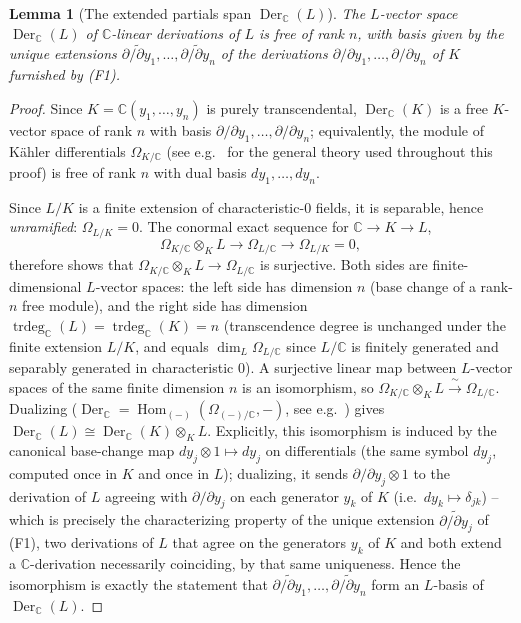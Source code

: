\documentclass[11pt,a4paper]{article}
\newtheorem{lemma}[theorem]{Lemma}
\begin{document}
\begin{lemma}[The extended partials span $\operatorname{Der}_{\mathbb{C}}(L)$]\label{lem:der-span}
The $L$-vector space $\operatorname{Der}_{\mathbb{C}}(L)$ of
$\mathbb{C}$-linear derivations of $L$ is free of rank $n$, with basis
given by the unique extensions
$\widetilde{\partial/\partial y_1},\dots,\widetilde{\partial/\partial y_n}$
of the derivations $\partial/\partial y_1,\dots,\partial/\partial y_n$
of $K$ furnished by (F1).
\end{lemma}

\begin{proof}
Since $K = \mathbb{C}(y_1,\dots,y_n)$ is purely transcendental,
$\operatorname{Der}_{\mathbb{C}}(K)$ is a free $K$-vector space of
rank $n$ with basis $\partial/\partial y_1,\dots,\partial/\partial y_n$;
equivalently, the module of K\"ahler differentials
$\Omega_{K/\mathbb{C}}$ (see e.g.\ \cite[\S 25]{Matsumura1989} for
the general theory used throughout this proof)
is free of rank $n$ with dual basis $dy_1,\dots,dy_n$.

Since $L/K$ is a finite extension of characteristic-$0$ fields, it is
separable, hence \emph{unramified}: $\Omega_{L/K} = 0$. The conormal
exact sequence for $\mathbb{C} \to K \to L$,
\[
  \Omega_{K/\mathbb{C}} \otimes_K L \longrightarrow \Omega_{L/\mathbb{C}}
    \longrightarrow \Omega_{L/K} = 0,
\]
therefore shows that $\Omega_{K/\mathbb{C}} \otimes_K L \to \Omega_{L/\mathbb{C}}$
is surjective. Both sides are finite-dimensional $L$-vector spaces:
the left side has dimension $n$ (base change of a rank-$n$ free
module), and the right side has dimension
$\operatorname{trdeg}_{\mathbb{C}}(L) = \operatorname{trdeg}_{\mathbb{C}}(K) = n$
(transcendence degree is unchanged under the finite extension $L/K$,
and equals $\dim_L \Omega_{L/\mathbb{C}}$ since $L/\mathbb{C}$ is
finitely generated and separably generated in characteristic $0$). A
surjective linear map between $L$-vector spaces of the same finite
dimension $n$ is an isomorphism, so
$\Omega_{K/\mathbb{C}} \otimes_K L \xrightarrow{\ \sim\ } \Omega_{L/\mathbb{C}}$.
Dualizing ($\operatorname{Der}_{\mathbb{C}} = \operatorname{Hom}_{(-)}(\Omega_{(-)/\mathbb{C}}, -)$,
see e.g.\ \cite[\S 25--26]{Matsumura1989})
gives
$\operatorname{Der}_{\mathbb{C}}(L) \cong \operatorname{Der}_{\mathbb{C}}(K) \otimes_K L$.
Explicitly, this isomorphism is induced by the canonical base-change
map $dy_j \otimes 1 \mapsto dy_j$ on differentials (the same symbol
$dy_j$, computed once in $K$ and once in $L$); dualizing, it sends
$\partial/\partial y_j \otimes 1$ to the derivation of $L$ agreeing
with $\partial/\partial y_j$ on each generator $y_k$ of $K$ (i.e.\
$dy_k \mapsto \delta_{jk}$) -- which is precisely the characterizing
property of the unique extension $\widetilde{\partial/\partial y_j}$
of (F1), two derivations of $L$ that agree on the generators $y_k$ of
$K$ and both extend a $\mathbb{C}$-derivation necessarily coinciding,
by that same uniqueness. Hence the isomorphism is exactly the
statement that
$\widetilde{\partial/\partial y_1},\dots,\widetilde{\partial/\partial y_n}$
form an $L$-basis of $\operatorname{Der}_{\mathbb{C}}(L)$.
\end{proof}
\end{document}
